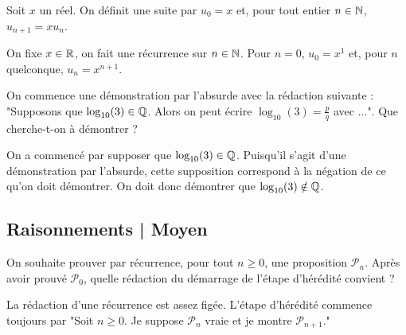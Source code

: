 \begin{question}
Soit $x$ un réel. On définit une suite par $u_0=x$ et, pour tout entier $n\in \mathbb{N}$, $u_{n+1}=xu_n$. 
\begin{answers} 
\end{answers}
\begin{explanations} 
On fixe $x \in \mathbb{R}$, on fait une récurrence sur $n \in \mathbb{N}$. Pour $n=0$, $u_0=x^1$ et, pour $n$ quelconque, $u_n = x^{n+1}$.
\end{explanations}
\end{question}


\begin{question}
On commence une démonstration par l'absurde avec la rédaction suivante : "Supposons que $\log_{10}(3) \in \mathbb{Q}$. Alors on peut écrire $\log_{10}(3) = \frac p q$ avec ...". Que cherche-t-on à démontrer ?
\begin{answers} 
\end{answers}
\begin{explanations} 
On a commencé par supposer que $\log_{10}(3) \in \mathbb{Q}$. Puisqu'il s'agit d'une démonstration par l'absurde, cette supposition correspond à la négation de ce qu'on doit démontrer. On doit donc démontrer que $\log_{10}(3) \notin \mathbb{Q}$.
\end{explanations}
\end{question}


\subsection{Raisonnements | Moyen}

\begin{question}
On souhaite prouver par récurrence, pour tout $n\ge0$, une proposition $\mathcal{P}_n$.
Après avoir prouvé $\mathcal{P}_0$, quelle rédaction du démarrage de l'étape d'hérédité convient ?
\begin{answers} 
\end{answers}
\begin{explanations} 
La rédaction d'une récurrence est assez figée. L'étape d'hérédité commence toujours par "Soit $n\ge0$. Je suppose $\mathcal{P}_n$ vraie et je montre $\mathcal{P}_{n+1}$."
\end{explanations}
\end{question}


